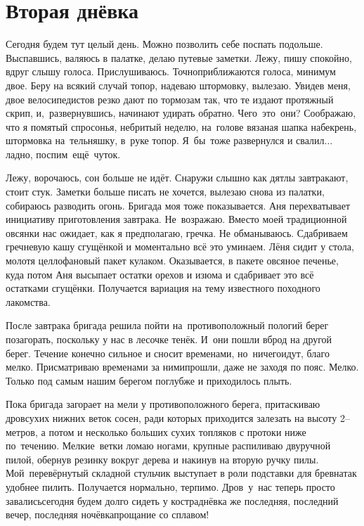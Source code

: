 \chapter{Вторая днёвка}
\vepsianrose

Сегодня будем тут целый день. Можно позволить себе поспать подольше. Выспавшись, валяюсь в палатке, делаю путевые заметки. Лежу, пишу спокойно, вдруг слышу голоса. Прислушиваюсь. Точно\mdash приближаются голоса, минимум двое. Беру на всякий случай топор, надеваю штормовку, вылезаю. Увидев меня, двое велосипедистов резко дают по тормозам так, что те издают протяжный скрип, и,~развернувшись, начинают удирать обратно. Чего~это~они? Соображаю, что я помятый спросонья, небритый неделю, на~голове вязаная шапка набекрень, штормовка на~тельняшку, в~руке топор. Я~бы~тоже развернулся и свалил$\ldots$ ладно, поспим~ещё~чуток. 

Лежу, ворочаюсь, сон больше не идёт. Снаружи слышно как дятлы завтракают, стоит стук. Заметки больше писать не хочется, вылезаю снова из палатки, собираюсь разводить огонь. Бригада моя тоже показывается. Аня перехватывает инициативу приготовления завтрака. Не~возражаю. Вместо моей традиционной овсянки нас ожидает, как я предполагаю, гречка. Не обманываюсь. Сдабриваем гречневую кашу сгущёнкой и моментально всё это уминаем. Лёня сидит у стола, молотя целлофановый пакет кулаком. Оказывается, в пакете овсяное печенье, куда потом Аня высыпает остатки орехов и изюма и сдабривает это всё остатками сгущёнки. Получается вариация на тему известного походного лакомства.

После завтрака бригада решила пойти на~противоположный пологий берег позагорать, поскольку у нас в лесочке тенёк. И~они пошли вброд на другой берег. Течение конечно сильное и сносит временами, но~ничего\mdash идут, благо мелко. Присматриваю временами за ними\mdash прошли, даже не заходя по пояс. Мелко. Только под самым нашим берегом поглубже и приходилось плыть. 

Пока бригада загорает на мели у противоположного берега, притаскиваю дров\mdash сухих нижних веток сосен, ради которых приходится залезать на высоту 2\thinspace\nobreakdash-- метров, а потом и несколько больших сухих топляков с протоки ниже по~течению. Мелкие~ветки ломаю ногами, крупные распиливаю двуручной пилой, обернув резинку вокруг дерева и накинув на вторую ручку пилы. Мой~перевёрнутый складной стульчик выступает в роли подставки для бревна\mdash так удобнее пилить. Получается нормально, терпимо. Дров~у~нас теперь просто завались\mdash сегодня будем долго сидеть у костра\mdash днёвка же последняя, последний вечер, последняя ночёвка\mdash прощание со сплавом! 

